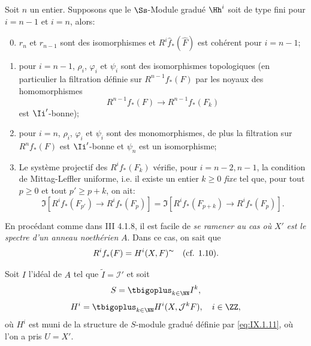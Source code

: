 \begin{theoreme} \label{IX.1.1} \setcounter{equation}{11}
Soit $n$ un entier. Supposons que le $\Ss$-Module gradu\'e $\Hh^i$ soit de type fini pour $i=n-1$ et $i=n$, alors:
\begin{enumerate}\setcounter{enumi}{-1}
\item
$r_n$ et $r_{n-1}$ sont des isomorphismes et $R^i\hat{f}_*(\hat{F})$ est coh\'erent pour $i=n-1$;
\item
pour $i=n-1$, $\rho_i$, $\varphi_i$ et $\psi_i$ sont des isomorphismes topologiques (en particulier la filtration d\'efinie sur $R^{n-1}f_*(F)$ par les noyaux des homomorphismes
\begin{equation} \label{eq:IX.1.12}
R^{n-1}f_*(F) \to R^{n-1}f_*(F_k)
\end{equation}
est $\Ii'$-bonne);

\item
pour $i=n$, $\rho_i$, $\varphi_i$ et $\psi_i$ sont des monomorphismes, de plus la filtration sur $R^n f_*(F)$ est $\Ii'$-bonne et $\psi_n$ est un isomorphisme;

\item
Le syst\`eme projectif des $R^i f_*(F_k)$ v\'erifie, pour $i=n-2, n-1$, la condition de Mittag-Leffler uniforme, i.e. il existe un entier $k\geq 0$ \emph{fixe} tel que, pour tout $p\geq 0$ et tout $p'\geq p+k$, on ait:
\begin{equation*}
\Im[R^i f_*(F_{p'})\to R^i f_*(F_p)]=\Im[R^i f_*(F_{p+k})\to R^i f_*(F_p)].
\end{equation*}
\end{enumerate}
\end{theoreme}

En proc\'edant comme dans \EGA III 4.1.8, il est facile de \emph{se ramener au cas où} $X'$ \emph{est le spectre d'un anneau noethérien} $A$. Dans ce cas, on sait que
\begin{equation} \label{eq:IX.1.13} R^if_*(F)=H^i(X, F)^\thicksim \quad \text{(cf. 1.10).}
\end{equation}

Soit $I$ l'id\'eal de $A$ tel que $\tilde{I}=\mathcal I'$ et soit
\begin{equation} \label{eq:IX.1.14}
S=\tbigoplus_{k \in \NN}I^k,
\end{equation}
\begin{equation} \label{eq:IX.1.15}
H^i=\tbigoplus_{k \in \NN}H^i(X, {\Jb}^k F), \quad i \in \ZZ,
\end{equation}
o\`u $H^i$ est muni de la structure de $S$-module gradu\'e d\'efinie par \ref{eq:IX.1.11}, o\`u l'on a pris $U=X'$.

